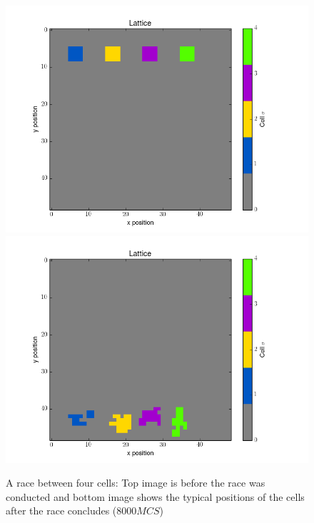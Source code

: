 \documentclass[12pt]{article}
\begin{document}
\begin{figure}[h]
	\centering
	\includegraphics[scale=0.5]{img/before_race_single}
	\includegraphics[scale=0.5]{img/after_race_single}
	\caption{A race between four cells: Top image is before the race was conducted and bottom image shows the typical positions of the cells after the race concludes ($8000MCS$)}
	\label{single_race}
\end{figure}
\end{document}
